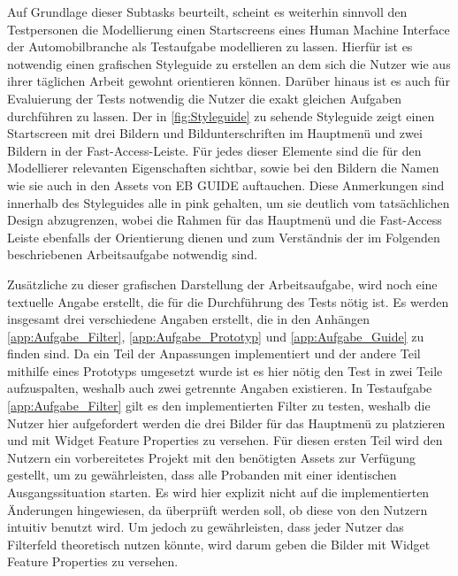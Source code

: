 Auf Grundlage dieser Subtasks beurteilt, scheint es weiterhin sinnvoll den Testpersonen die Modellierung einen Startscreens eines Human Machine Interface der Automobilbranche als Testaufgabe modellieren zu lassen.
Hierfür ist es notwendig einen grafischen Styleguide zu erstellen an dem sich die Nutzer wie aus ihrer täglichen Arbeit gewohnt orientieren können.
Darüber hinaus ist es auch für Evaluierung der Tests notwendig die Nutzer die exakt gleichen Aufgaben durchführen zu lassen.
Der in \cref{fig:Styleguide} zu sehende Styleguide zeigt einen Startscreen mit drei Bildern und Bildunterschriften im Hauptmenü und zwei Bildern in der Fast-Access-Leiste.
Für jedes dieser Elemente sind die für den Modellierer relevanten Eigenschaften sichtbar, sowie bei den Bildern die Namen wie sie auch in den Assets von EB GUIDE auftauchen.
Diese Anmerkungen sind innerhalb des Styleguides alle in pink gehalten, um sie deutlich vom tatsächlichen Design abzugrenzen, wobei die Rahmen für das Hauptmenü und die Fast-Access Leiste ebenfalls der Orientierung dienen und zum Verständnis der im Folgenden beschriebenen Arbeitsaufgabe notwendig sind.

Zusätzliche zu dieser grafischen Darstellung der Arbeitsaufgabe, wird noch eine textuelle Angabe erstellt, die für die Durchführung des Tests nötig ist.
Es werden insgesamt drei verschiedene Angaben erstellt, die in den Anhängen \ref{app:Aufgabe_Filter}, \ref{app:Aufgabe_Prototyp} und \ref{app:Aufgabe_Guide} zu finden sind.
Da ein Teil der Anpassungen implementiert und der andere Teil mithilfe eines Prototyps umgesetzt wurde ist es hier nötig den Test in zwei Teile aufzuspalten, weshalb auch zwei getrennte Angaben existieren.
In Testaufgabe \ref{app:Aufgabe_Filter} gilt es den implementierten Filter zu testen, weshalb die Nutzer hier aufgefordert werden die drei Bilder für das Hauptmenü zu platzieren und mit Widget Feature Properties zu versehen.
Für diesen ersten Teil wird den Nutzern ein vorbereitetes Projekt mit den benötigten Assets zur Verfügung gestellt, um zu gewährleisten, dass alle Probanden mit einer identischen Ausgangssituation starten.
Es wird hier explizit nicht auf die implementierten Änderungen hingewiesen, da überprüft werden soll, ob diese von den Nutzern intuitiv benutzt wird.
Um jedoch zu gewährleisten, dass jeder Nutzer das Filterfeld theoretisch nutzen könnte, wird darum geben die Bilder mit Widget Feature Properties zu versehen.

